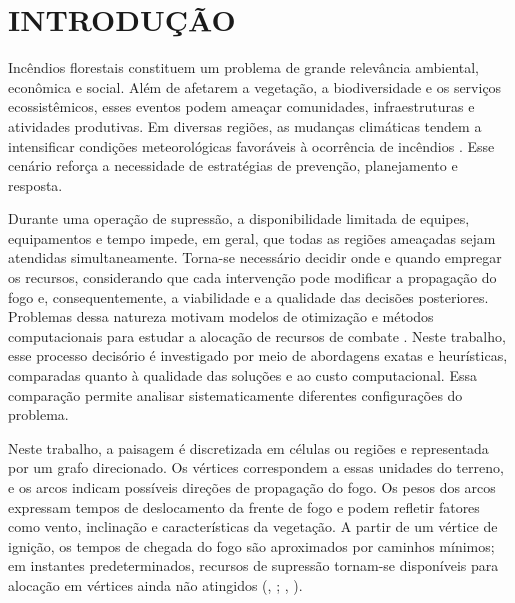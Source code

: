 \chapter{\MakeUppercase{Introdução}}

Incêndios florestais constituem um problema de grande relevância ambiental,
econômica e social. Além de afetarem a vegetação, a biodiversidade e os serviços
ecossistêmicos, esses eventos podem ameaçar comunidades, infraestruturas e
atividades produtivas. Em diversas regiões, as mudanças climáticas tendem a
intensificar condições meteorológicas favoráveis à ocorrência de incêndios
\cite{IPCC2023}. Esse cenário reforça a necessidade de estratégias de prevenção,
planejamento e resposta.

Durante uma operação de supressão, a disponibilidade limitada de equipes,
equipamentos e tempo impede, em geral, que todas as regiões ameaçadas sejam
atendidas simultaneamente. Torna-se necessário decidir onde e quando empregar
os recursos, considerando que cada intervenção pode modificar a propagação do
fogo e, consequentemente, a viabilidade e a qualidade das decisões posteriores.
Problemas dessa natureza motivam modelos de otimização e métodos computacionais
para estudar a alocação de recursos de combate
\cite{Alvelos2018,MendesAlvelos2023}. Neste trabalho, esse processo decisório é investigado por meio de
abordagens exatas e heurísticas, comparadas quanto à qualidade das soluções
e ao custo computacional. Essa comparação permite analisar sistematicamente
diferentes configurações do problema.

Neste trabalho, a paisagem é discretizada em células ou regiões e representada
por um grafo direcionado. Os vértices correspondem a essas unidades do terreno,
e os arcos indicam possíveis direções de propagação do fogo. Os pesos dos arcos expressam
tempos de deslocamento da frente de fogo e podem refletir fatores como vento,
inclinação e características da vegetação. A partir de um vértice de ignição, os
tempos de chegada do fogo são aproximados por caminhos mínimos; em instantes
predeterminados, recursos de supressão tornam-se disponíveis para alocação em
vértices ainda não atingidos (\citeauthor{Alvelos2018}, \citeyear{Alvelos2018}; \citeauthor{DelazeriRitt2024}, \citeyear{DelazeriRitt2024,DelazeriRitt2026}).

